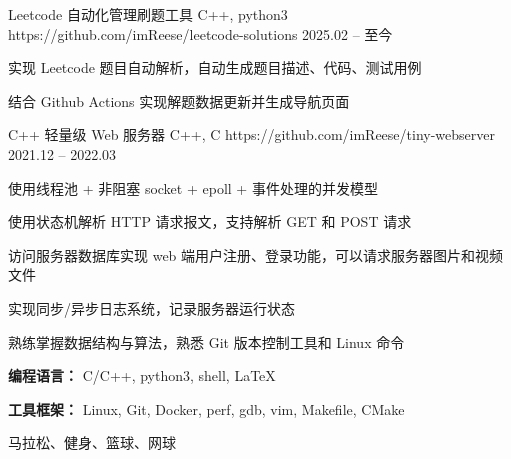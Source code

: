 \documentclass{resume}
\begin{document}
\begin{CJK}{UTF8}{gbsn}
\begin{ProjectSection}
  \beginprojectitem
    { Leetcode 自动化管理刷题工具 }
    { C++, python3 }
    { https://github.com/imReese/leetcode-solutions }
    { 2025.02 -- 至今 }
    \item 实现 Leetcode 题目自动解析，自动生成题目描述、代码、测试用例
    \item 结合 Github Actions 实现解题数据更新并生成导航页面
  \endprojectitem

  \beginprojectitem
    { C++ 轻量级 Web 服务器 }
    { C++, C }
    { https://github.com/imReese/tiny-webserver }
    { 2021.12 -- 2022.03 }
    \item 使用线程池 + 非阻塞 socket + epoll + 事件处理的并发模型
    \item 使用状态机解析 HTTP 请求报文，支持解析 GET 和 POST 请求
    \item 访问服务器数据库实现 web 端用户注册、登录功能，可以请求服务器图片和视频文件
    \item 实现同步/异步日志系统，记录服务器运行状态
  \endprojectitem

\end{ProjectSection}

\begin{SkillsSection}
  { 熟练掌握数据结构与算法，熟悉 Git 版本控制工具和 Linux 命令}
  \item \textbf{ 编程语言：} C/C++, python3, shell, LaTeX
  \item \textbf{ 工具框架：} Linux, Git, Docker, perf, gdb, vim, Makefile, CMake
\end{SkillsSection}

\begin{InterestsSection}
  { 马拉松、健身、篮球、网球 }
\end{InterestsSection}

\end{CJK}
\end{document}
